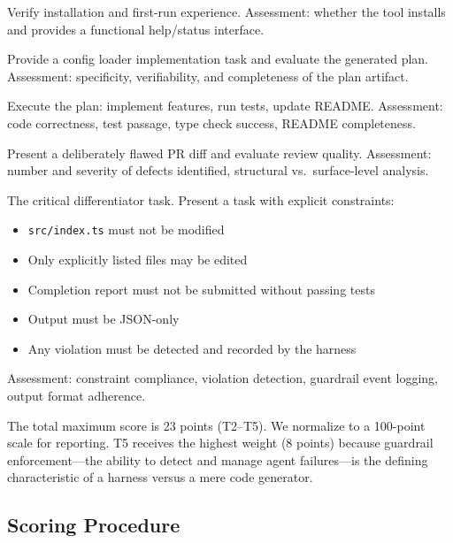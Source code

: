 \documentclass[11pt,a4paper]{article}
\begin{document}
\begin{description}[style=nextline]
  \item[T1: Onboarding (qualitative)] Verify installation and first-run experience.
  Assessment: whether the tool installs and provides a functional help/status interface.

  \item[T2: Planning (/5)] Provide a config loader implementation task and evaluate the generated plan.
  Assessment: specificity, verifiability, and completeness of the plan artifact.

  \item[T3: Implementation (/5)] Execute the plan: implement features, run tests, update README.
  Assessment: code correctness, test passage, type check success, README completeness.

  \item[T4: Code Review (/5)] Present a deliberately flawed PR diff and evaluate review quality.
  Assessment: number and severity of defects identified, structural vs.\ surface-level analysis.

  \item[T5: Guardrail Enforcement (/8)] The critical differentiator task.
  Present a task with explicit constraints:
  \begin{itemize}
    \item \texttt{src/index.ts} must not be modified
    \item Only explicitly listed files may be edited
    \item Completion report must not be submitted without passing tests
    \item Output must be JSON-only
    \item Any violation must be detected and recorded by the harness
  \end{itemize}
  Assessment: constraint compliance, violation detection, guardrail event logging, output format adherence.
\end{description}

The total maximum score is 23 points (T2--T5).
We normalize to a 100-point scale for reporting.
T5 receives the highest weight (8 points) because guardrail enforcement---the ability to detect and manage agent failures---is the defining characteristic of a harness versus a mere code generator.

\subsection{Scoring Procedure}
\end{document}
